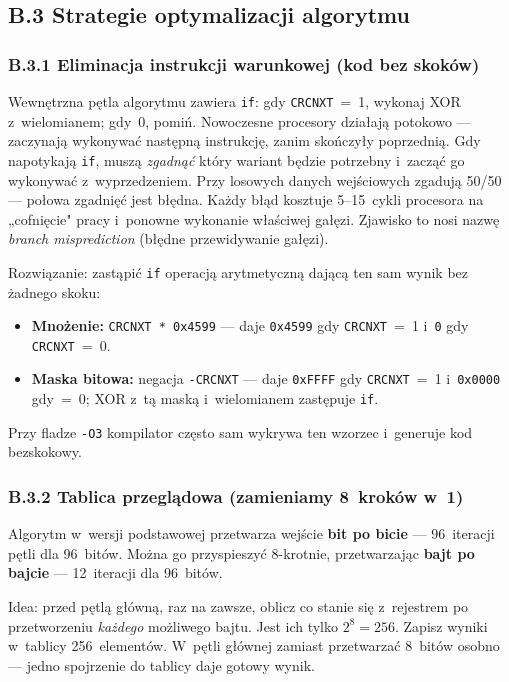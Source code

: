 \documentclass[12pt,a4paper]{article}
\begin{document}
\subsection*{B.3 Strategie optymalizacji algorytmu}

\subsubsection*{B.3.1 Eliminacja instrukcji warunkowej (kod bez skoków)}

Wewnętrzna pętla algorytmu zawiera \texttt{if}: gdy \texttt{CRCNXT}~=~1,
wykonaj XOR z~wielomianem; gdy~0, pomiń. Nowoczesne procesory działają
potokowo — zaczynają wykonywać następną instrukcję, zanim skończyły poprzednią.
Gdy napotykają \texttt{if}, muszą \emph{zgadnąć} który wariant będzie
potrzebny i~zacząć go wykonywać z~wyprzedzeniem. Przy losowych danych wejściowych
zgadują 50/50 — połowa zgadnięć jest błędna. Każdy błąd kosztuje 5–15~cykli
procesora na „cofnięcie" pracy i~ponowne wykonanie właściwej gałęzi.
Zjawisko to nosi nazwę \textit{branch misprediction} (błędne przewidywanie
gałęzi).

Rozwiązanie: zastąpić \texttt{if} operacją arytmetyczną dającą ten sam wynik
bez żadnego skoku:
\begin{itemize}
    \item \textbf{Mnożenie:} \texttt{CRCNXT * 0x4599} — daje \texttt{0x4599}
          gdy \texttt{CRCNXT}~=~1 i~\texttt{0} gdy \texttt{CRCNXT}~=~0.
    \item \textbf{Maska bitowa:} negacja \texttt{-CRCNXT} — daje
          \texttt{0xFFFF} gdy \texttt{CRCNXT}~=~1 i~\texttt{0x0000} gdy~=~0;
          XOR z~tą maską i~wielomianem zastępuje \texttt{if}.
\end{itemize}
Przy fladze \texttt{-O3} kompilator często sam wykrywa ten wzorzec i~generuje
kod bezskokowy.

\subsubsection*{B.3.2 Tablica przeglądowa (zamieniamy 8~kroków w~1)}

Algorytm w~wersji podstawowej przetwarza wejście \textbf{bit po bicie} —
96~iteracji pętli dla 96~bitów. Można go przyspieszyć 8-krotnie, przetwarzając
\textbf{bajt po bajcie} — 12~iteracji dla 96~bitów.

Idea: przed pętlą główną, raz na zawsze, oblicz co stanie się z~rejestrem po
przetworzeniu \emph{każdego} możliwego bajtu. Jest ich tylko $2^8 = 256$.
Zapisz wyniki w~tablicy 256~elementów. W~pętli głównej zamiast przetwarzać
8~bitów osobno — jedno spojrzenie do tablicy daje gotowy wynik.
\end{document}
